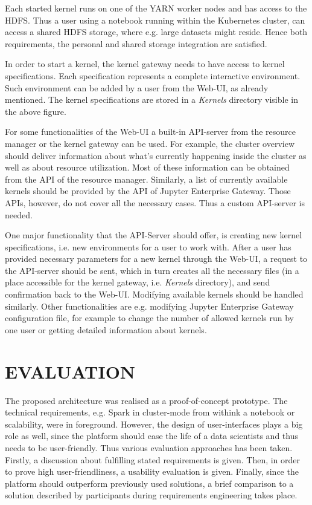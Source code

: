 \documentclass[a4paper,twoside]{article}
\begin{document}
Each started kernel runs on one of the YARN worker nodes and has access to the HDFS. Thus a user using a notebook running within the Kubernetes cluster, can access a shared HDFS storage, where e.g. large datasets might reside. Hence both requirements, the personal and shared storage integration are satisfied.

In order to start a kernel, the kernel gateway needs to have access to kernel specifications. Each specification represents a complete interactive environment. Such environment can be added by a user from the Web-UI, as already mentioned. The kernel specifications are stored in a \textit{Kernels} directory visible in the above figure. 

For some functionalities of the Web-UI a built-in API-server from the resource manager or the kernel gateway can be used. For example, the cluster overview should deliver information about what's currently happening inside the cluster as well as about resource utilization. Most of these information can be obtained from the API of the resource manager. Similarly, a list of currently available kernels should be provided by the API of Jupyter Enterprise Gateway. Those APIs, however, do not cover all the necessary cases. Thus a custom API-server is needed. 

One major functionality that the API-Server should offer, is creating new kernel specifications, i.e. new environments for a user to work with. After a user has provided necessary parameters for a new kernel through the Web-UI, a request to the API-server should be sent, which in turn creates all the necessary files (in a place accessible for the kernel gateway, i.e. \textit{Kernels} directory), and send confirmation back to the Web-UI. Modifying available kernels should be handled similarly. Other functionalities are e.g. modifying Jupyter Enterprise Gateway configuration file, for example to change the number of allowed kernels run by one user or getting detailed information about kernels.

\section{\uppercase{Evaluation}}

The proposed architecture was realised as a proof-of-concept prototype. The technical requirements, e.g. Spark in cluster-mode from withink a notebook or scalability, were in foreground. However, the design of user-interfaces plays a big role as well, since the platform should ease the life of a data scientists and thus needs to be user-friendly. Thus various evaluation approaches has been taken. Firstly, a discussion about fulfilling stated requirements is given. Then, in order to prove high user-friendliness, a usability evaluation is given. Finally, since the platform should outperform previously used solutions, a brief comparison to a solution described by participants during requirements engineering takes place.
\end{document}
